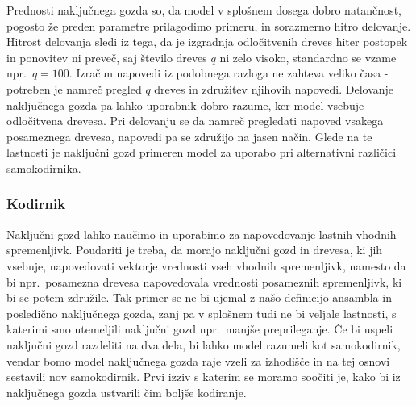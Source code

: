 \documentclass[12pt,a4paper]{article}
\begin{document}


Prednosti naključnega gozda so, da model v splošnem dosega dobro natančnost, pogosto že preden parametre prilagodimo primeru, in sorazmerno hitro delovanje. 
Hitrost delovanja sledi iz tega, da je izgradnja odločitvenih dreves hiter postopek in ponovitev ni preveč, saj število dreves $q$ ni zelo visoko, standardno se vzame npr.\ $q = 100$. 
Izračun napovedi iz podobnega razloga ne zahteva veliko časa - potreben je namreč pregled $q$ dreves in združitev njihovih napovedi. 
Delovanje naključnega gozda pa lahko uporabnik dobro razume, ker model vsebuje odločitvena drevesa. 
Pri delovanju se da namreč pregledati napoved vsakega posameznega drevesa, napovedi pa se združijo na jasen način. 
Glede na te lastnosti je naključni gozd primeren model za uporabo pri alternativni različici samokodirnika.



\subsubsection{Kodirnik}

Naključni gozd lahko naučimo in uporabimo za napovedovanje lastnih vhodnih spremenljivk. 
Poudariti je treba, da morajo naključni gozd in drevesa, ki jih vsebuje, napovedovati vektorje vrednosti vseh vhodnih spremenljivk, namesto da bi npr.\ 
posamezna drevesa napovedovala vrednosti posameznih spremenljivk, ki bi se potem združile. 
Tak primer se ne bi ujemal z našo definicijo ansambla in posledično naključnega gozda, zanj pa v splošnem tudi ne bi veljale lastnosti, s katerimi smo utemeljili naključni gozd npr.\ manjše preprileganje. 
Če bi uspeli naključni gozd razdeliti na dva dela, bi lahko model razumeli kot samokodirnik, vendar bomo model naključnega gozda raje vzeli za izhodišče in na tej osnovi sestavili nov samokodirnik. 
Prvi izziv s katerim se moramo soočiti je, kako bi iz naključnega gozda ustvarili čim boljše kodiranje.
\end{document}

